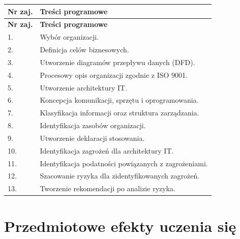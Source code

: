 \documentclass[12pt, a4paper]{article}
\newcommand{\thdrule}{\noalign{\global\setlength{\extrarowheight}{0pt}}}
\newcommand{\thdend}{\noalign{\global\setlength{\extrarowheight}{3pt}}}
\begin{document}
{\scriptsize
\begin{longtable}{m{1.5cm}m{14.5cm}}
\thdrule\toprule
\rowcolor{pjatkRed} {\color{white}\textbf{Nr zaj.}} & {\color{white}\textbf{Treści programowe}} \\
\midrule\thdend
\endfirsthead
\thdrule\toprule
\rowcolor{pjatkRed} {\color{white}\textbf{Nr zaj.}} & {\color{white}\textbf{Treści programowe}} \\
\midrule\thdend
\endhead
  \rowcolor{tableRowLight} 1. & Wybór organizacji. \\
  \rowcolor{tableRowAlt} 2. & Definicja celów biznesowych. \\
  \rowcolor{tableRowLight} 3. & Utworzenie diagramów przepływu danych (DFD). \\
  \rowcolor{tableRowAlt} 4. & Procesowy opis organizacji zgodnie z ISO 9001. \\
  \rowcolor{tableRowLight} 5. & Utworzenie architektury IT. \\
  \rowcolor{tableRowAlt} 6. & Koncepcja komunikacji, sprzętu i oprogramowania. \\
  \rowcolor{tableRowLight} 7. & Klasyfikacja informacji oraz struktura zarządzania. \\
  \rowcolor{tableRowAlt} 8. & Identyfikacja zasobów organizacji. \\
  \rowcolor{tableRowLight} 9. & Utworzenie deklaracji stosowania. \\
  \rowcolor{tableRowAlt} 10. & Identyfikacja zagrożeń dla architektury IT. \\
  \rowcolor{tableRowLight} 11. & Identyfikacja podatności powiązanych z zagrożeniami. \\
  \rowcolor{tableRowAlt} 12. & Szacowanie ryzyka dla zidentyfikowanych zagrożeń. \\
  \rowcolor{tableRowLight} 13. & Tworzenie rekomendacji po analizie ryzyka. \\
\bottomrule
\end{longtable}}

\section{Przedmiotowe efekty uczenia się}
\end{document}
